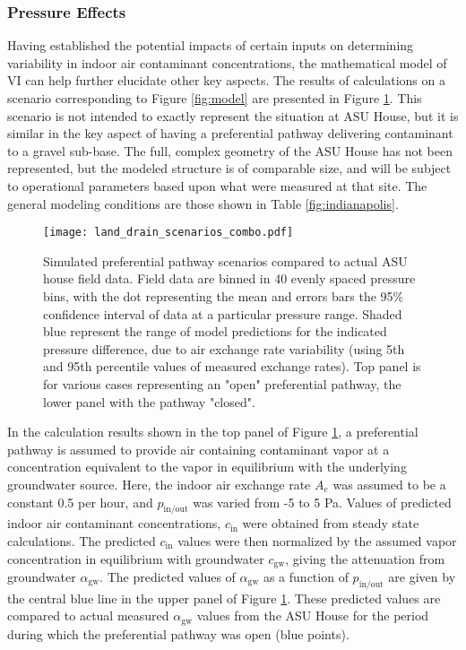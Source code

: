 \documentclass[preprint,12pt]{elsarticle}
\begin{document}
\subsubsection{Pressure Effects}\label{s:results_modeling_pressure}

Having established the potential impacts of certain inputs on determining variability in indoor air contaminant concentrations, the mathematical model of VI can help further elucidate other key aspects.
The results of calculations on a scenario corresponding to Figure \ref{fig:model} are presented in Figure \ref{fig:land_drain_scenarios}.
This scenario is not intended to exactly represent the situation at ASU House, but it is similar in the key aspect of having a preferential pathway delivering contaminant to a gravel sub-base.
The full, complex geometry of the ASU House has not been represented, but the modeled structure is of comparable size, and will be subject to operational parameters based upon what were measured at that site.
The general modeling conditions are those shown in Table \ref{fig:indianapolis}.\par

\begin{figure}[htb!]
 \centering
 \texttt{[image: land\_drain\_scenarios\_combo.pdf]}
 \caption{Simulated preferential pathway scenarios compared to actual ASU house field data. Field data are binned in 40 evenly spaced pressure bins, with the dot representing the mean and errors bars the 95\% confidence interval of data at a particular pressure range. Shaded blue represent the range of model predictions for the indicated pressure difference, due to air exchange rate variability (using 5th and 95th percentile values of measured exchange rates). Top panel is for various cases representing an "open" preferential pathway, the lower panel with the pathway "closed".}\label{fig:land_drain_scenarios}
\end{figure}

In the calculation results shown in the top panel of Figure \ref{fig:land_drain_scenarios}, a preferential pathway is assumed to provide air containing contaminant vapor at a concentration equivalent to the vapor in equilibrium with the underlying groundwater source.
Here, the indoor air exchange rate $A_e$ was assumed to be a constant 0.5 per hour, and $p_\mathrm{in/out}$ was varied from -5 to 5 Pa.
Values of predicted indoor air contaminant concentrations, $c_\mathrm{in}$ were obtained from steady state calculations.
The predicted $c_\mathrm{in}$ values were then normalized by the assumed vapor concentration in equilibrium with groundwater $c_\mathrm{gw}$, giving the attenuation from groundwater $\alpha_\mathrm{gw}$.
The predicted values of $\alpha_\mathrm{gw}$ as a function of $p_\mathrm{in/out}$ are given by the central blue line in the upper panel of Figure \ref{fig:land_drain_scenarios}.
These predicted values are compared to actual measured $\alpha_\mathrm{gw}$ values from the ASU House for the period during which the preferential pathway was open (blue points).\par
\end{document}
